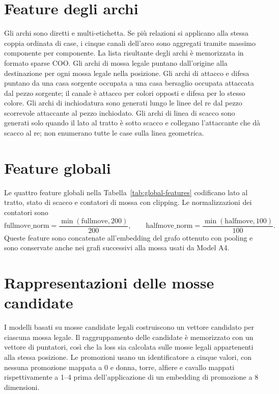 

\section{Feature degli archi}
\label{app:graph-features:edges}

Gli archi sono diretti e multi-etichetta.  Se più relazioni si applicano alla stessa coppia ordinata di case, i cinque canali dell'arco sono aggregati tramite massimo componente per componente.  La lista risultante degli archi è memorizzata in formato sparse COO.  Gli archi di mossa legale puntano dall'origine alla destinazione per ogni mossa legale nella posizione.  Gli archi di attacco e difesa puntano da una casa sorgente occupata a una casa bersaglio occupata attaccata dal pezzo sorgente; il canale è attacco per colori opposti e difesa per lo stesso colore.  Gli archi di inchiodatura sono generati lungo le linee del re dal pezzo scorrevole attaccante al pezzo inchiodato.  Gli archi di linea di scacco sono generati solo quando il lato al tratto è sotto scacco e collegano l'attaccante che dà scacco al re; non enumerano tutte le case sulla linea geometrica.



\section{Feature globali}
\label{app:graph-features:globals}

Le quattro feature globali nella Tabella~\ref{tab:global-features} codificano lato al tratto, stato di scacco e contatori di mossa con clipping.  Le normalizzazioni dei contatori sono
\[
\text{fullmove\_norm}=\frac{\min(\text{fullmove},200)}{200}, \qquad
\text{halfmove\_norm}=\frac{\min(\text{halfmove},100)}{100}.
\]
Queste feature sono concatenate all'embedding del grafo ottenuto con pooling e sono conservate anche nei grafi successivi alla mossa usati da Model A4.



\section{Rappresentazioni delle mosse candidate}
\label{app:graph-features:candidates}

I modelli basati su mosse candidate legali costruiscono un vettore candidato per ciascuna mossa legale.  Il raggruppamento delle candidate è memorizzato con un vettore di puntatori, così che la loss sia calcolata sulle mosse legali appartenenti alla stessa posizione.  Le promozioni usano un identificatore a cinque valori, con nessuna promozione mappata a 0 e donna, torre, alfiere e cavallo mappati rispettivamente a 1--4 prima dell'applicazione di un embedding di promozione a 8 dimensioni.

